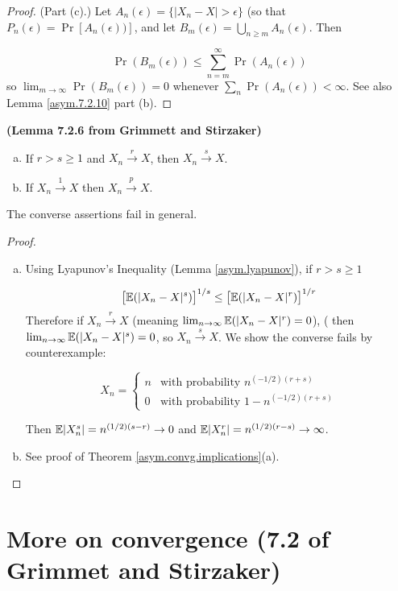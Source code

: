 \begin{proof}(Part (c).) Let \(A_n(\epsilon) = \{|X_n - X| > \epsilon\}\) (so that \(P_n(\epsilon) = \Pr[A_n(\epsilon))]\), and let \(B_m(\epsilon) = \bigcup_{n \geq m} A_n(\epsilon)\). Then

\[
\Pr(B_m(\epsilon)) \leq \sum_{n=m}^\infty \Pr(A_n(\epsilon))
\]
so \(\lim_{m \to \infty} \Pr(B_m(\epsilon)) = 0\) whenever \(\sum_n \Pr(A_n(\epsilon)) < \infty\). See also Lemma \ref{asym.7.2.10} part (b).\end{proof}

\begin{lemma}\label{asym.7.2.6} \textbf{(Lemma 7.2.6 from Grimmett and Stirzaker)} 
\begin{enumerate}[(a)]
\item If \(r > s \geq 1\) and \(X_n \xrightarrow{r} X\), then \(X_n \xrightarrow{s} X\).
\item If \(X_n \xrightarrow{1} X\) then \(X_n \xrightarrow{p} X\). 
\end{enumerate}
The converse assertions fail in general.
\end{lemma}

\begin{proof}
\begin{enumerate}[(a)]
\item
Using Lyapunov's Inequality (Lemma \ref{asym.lyapunov}), if \(r > s \geq 1\)

\[
\big[ \mathbb{E}(|X_n - X|^s) \big]^{1/s} \leq \big[ \mathbb{E}(|X_n - X|^r) \big]^{1/r}
\]
Therefore if \(X_n \xrightarrow{r} X\) (meaning \(\lim_{n \to \infty} \mathbb{E}(|X_n - X|^r) = 0\)), ( then  \(\lim_{n \to \infty} \mathbb{E}(|X_n - X|^s) = 0\), so \(X_n \xrightarrow{s} X\). We show the converse fails by counterexample:

\[
X_n = \begin{cases}
n & \text{with probability } n^{(-1/2)(r+s)} \\
0 & \text{with probability } 1 -  n^{(-1/2)(r+s)}
\end{cases}
\]

Then \(\mathbb{E}|X_n^s| = n^{(1/2)(s-r)} \to 0\) and \(\mathbb{E}|X_n^r| = n^{(1/2)(r-s)} \to \infty\).

\item See proof of Theorem \ref{asym.convg.implications}(a).

\end{enumerate}
\end{proof}


\section{More on convergence (7.2 of Grimmet and Stirzaker)}

